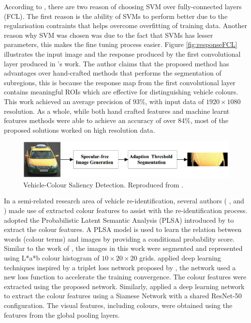 According to , there are two reason of choosing SVM over
fully-connected layers (FCL). The first reason is the ability of SVMs to perform
better due to the regularisation contraints that helps overcome overfitting of
training data. Another reason why SVM was chosen was due to the fact that SVMs
has lesser parameters, this makes the fine tuning process easier. Figure
\ref{fig:responseFCL} illustrates the input image and the response produced by
the first convolutional layer produced in 's work. The
author claims that the proposed method has advantages over hand-crafted methods
that performs the segmentation of subregions, this is because the response map
from the first convolutional layer contains meaningful ROIs which are effective
for distinguishing vehicle colours. This work achieved an average precision of
93\%, with input data of $1920 \times 1080$ resolution. As a whole, while both
hand crafted features and machine learnt features methods were able to achieve
an accuracy of over 84\%, most of the proposed solutions worked on high
resolution data.

\begin{figure}[hbt!]
 \centering
 \includegraphics[width=1\textwidth]{image/lit/salient1.png}
 \caption[Vehicle-Colour Saliency Detection]{Vehicle-Colour Saliency Detection.
Reproduced from .}
 \label{fig:Colorsaliency}
\end{figure}

In a semi-related research area of vehicle re-identification, several authors (
,  and ) made use
of extracted colour features to assist with the re-identification process.
 adopted the Probabilistic Latent Semantic Analysis (PLSA)
introduced by  to extract the colour features. A PLSA
model is used to learn the relation between words (colour terms) and images by
providing a conditional probability score. Similar to the work of
, the images in this work were segmented and represented
using L*a*b colour histogram of $10 \times 20 \times 20$ grids.
 applied deep learning techniques inspired by a triplet loss
network proposed by , the network used a new loss function
to accelerate the training convergence. The colour features were extracted using
the proposed network. Similarly,  applied a deep
learning network to extract the colour features using a Siamese Network with a
shared ResNet-50 configuration. The visual features, including colours, were
obtained using the features from the global pooling layers.

